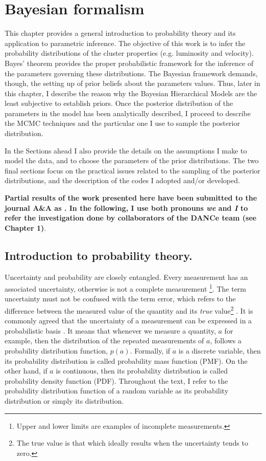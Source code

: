 \chapter{Bayesian formalism}
\label{chap:BHM}
This chapter provides a general introduction to probability theory and its application to parametric inference. The objective of this work is to infer the probability distributions of the cluster properties (e.g. luminosity and velocity). Bayes' theorem provides the proper probabilistic framework for the inference of the parameters governing these distributions. The Bayesian framework demands, though, the setting up of prior beliefs about the parameters values. Thus, later in this chapter, I  describe the reason why the Bayesian Hierarchical Models are the least subjective to establish priors. Once the posterior distribution of the parameters in the model has been analytically described, I proceed to describe the MCMC techniques and the particular one I use to sample the posterior distribution. 

In the Sections ahead I also provide the details on the assumptions I make to model the data, and to choose the parameters of the prior distributions. The two final sections focus on the practical issues related to the sampling of the posterior distributions, and the description of the codes I adopted and/or developed.

\textbf{Partial results of the work presented here have been submitted to the journal A\&A as \citet{Olivares2017}. In the following, I use both pronouns \emph{we} and \emph{I} to refer the investigation done by collaborators of the DANCe team (see Chapter 1)}.

\section{Introduction to probability theory.}
\label{sect:introprobability}
 
Uncertainty and probability are closely entangled. Every measurement has an associated uncertainty, otherwise is not a complete measurement \footnote{Upper and lower limits are examples of incomplete measurements.}. The term uncertainty must not be confused with the term error, which refers to the difference between the measured value of the quantity and its \emph{true} value\footnote{The true value is that which ideally results when the uncertainty tends to zero.} \citep{GUM2008}. It is commonly agreed that the uncertainty of a measurement can be expressed in a probabilistic basis \citep{GUM2008}. It means that whenever we measure a quantity, $a$ for example, then the distribution of the repeated measurements of $a$, follows a probability distribution function, $p(a)$. Formally, if $a$ is a discrete variable, then its probability distribution is called probability mass function (PMF). On the other hand, if $a$ is continuous, then its probability distribution  is called probability density function (PDF). Throughout the text, I refer to the probability distribution function of a random variable as its probability distribution or simply its distribution.


